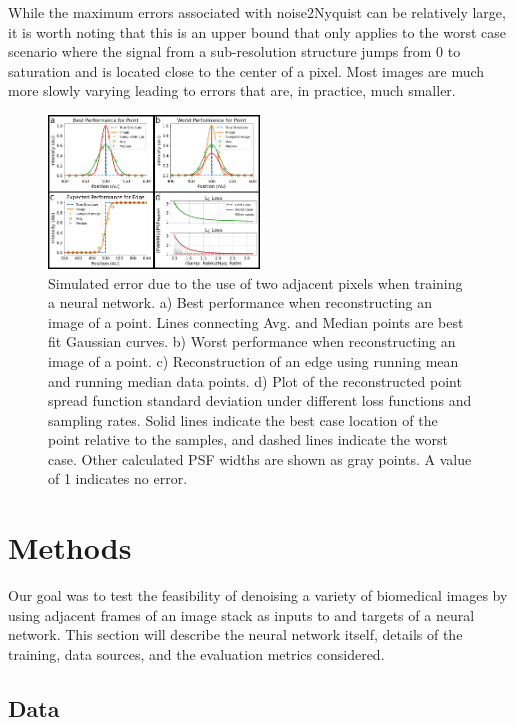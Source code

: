 \documentclass[journal,twoside,web]{ieeecolor}
\begin{document}
While the maximum errors associated with noise2Nyquist can be relatively large, it is worth noting that this is an upper bound that only applies to the worst case scenario where the signal from a sub-resolution structure jumps from 0 to saturation and is located close to the center of a pixel. Most images are much more slowly varying leading to errors that are, in practice, much smaller. 

\begin{figure}[hbt]
	\begin{center}
		\includegraphics[width=0.5\textwidth]{theoretical/noNoiseSimulation_ver02}
		\caption{\label{fig:noiselessSim} Simulated error due to the use of two adjacent pixels when training a neural network. a) Best performance when reconstructing an image of a point. Lines connecting Avg. and Median points are best fit Gaussian curves. b) Worst performance when reconstructing an image of a point. c) Reconstruction of an edge using running mean and running median data points. d) Plot of the reconstructed point spread function standard deviation under different loss functions and sampling rates. Solid lines indicate the best case location of the point relative to the samples, and dashed lines indicate the worst case. Other calculated PSF widths are shown as gray points. A value of 1 indicates no error. }
	\end{center}
\end{figure}

\section{Methods}
Our goal was to test the feasibility of denoising a variety of biomedical images by using adjacent frames of an image stack as inputs to and targets of a neural network. This section will describe the neural network itself, details of the training, data sources, and the evaluation metrics considered.

\subsection{Data}
\end{document}

